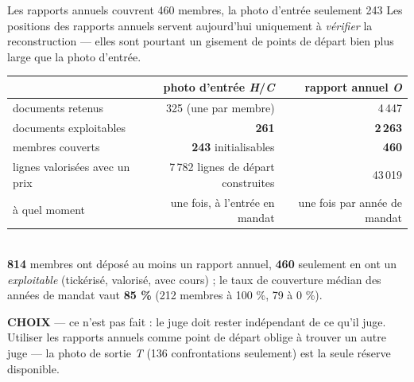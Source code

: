 \documentclass[11pt,aspectratio=169]{beamer}
\newcommand{\defl}[1]{{\scriptsize\color{black!55}#1}}
\newcommand{\choixbox}[1]{%
  \colorbox{alertred!8}{\parbox{\dimexpr\linewidth-8pt}{\scriptsize
    \textbf{\textcolor{alertred}{CHOIX}}\; --- #1}}}
\begin{document}
\begin{frame}{Les rapports annuels couvrent 460 membres, la photo d'entrée seulement 243}
  \centering
  {\footnotesize Les positions des rapports annuels servent aujourd'hui uniquement à
  \emph{vérifier} la reconstruction --- elles sont pourtant un gisement de points de départ
  bien plus large que la photo d'entrée.}\\[2.5mm]
  {\footnotesize\begin{tabular}{l r r}
    \toprule
    & photo d'entrée \emph{H}/\emph{C} & rapport annuel \emph{O}\\
    \midrule
    documents retenus                 & 325 \defl{(une par membre)} & 4\,447\\
    documents exploitables            & \textbf{261} & \textbf{2\,263}\\
    membres couverts                  & \textbf{243} initialisables & \textbf{460}\\
    lignes valorisées avec un prix    & 7\,782 lignes de départ construites & 43\,019\\
    à quel moment                     & une fois, à l'entrée en mandat & une fois par année de mandat\\
    \bottomrule
  \end{tabular}}\\[2.5mm]
  {\footnotesize \textbf{814} membres ont déposé au moins un rapport annuel, \textbf{460}
  seulement en ont un \emph{exploitable} (tickérisé, valorisé, avec cours) ; le taux de couverture
  médian des années de mandat vaut \textbf{85 \%} (212 membres à 100 \%, 79 à 0 \%).}\\[2mm]
  \choixbox{ce n'est pas fait : le juge doit rester indépendant de ce qu'il juge. Utiliser les
  rapports annuels comme point de départ oblige à trouver un autre juge --- la photo de sortie
  \emph{T} (136 confrontations seulement) est la seule réserve disponible.}
\end{frame}
\end{document}
